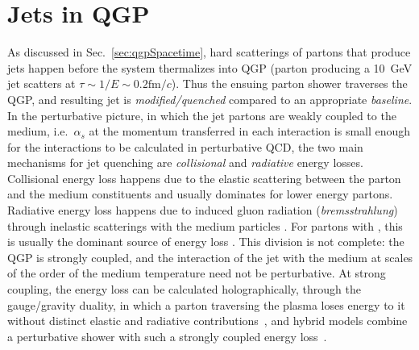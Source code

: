 \section{Jets in QGP}
\label{sec:jetsInQGP}
As discussed in Sec.~\ref{sec:qgpSpacetime}, hard scatterings of partons that produce jets happen before the system thermalizes into QGP (parton producing a 10~GeV jet scatters at \(\tau \sim 1/E \sim 0.2\text{fm}/c\)). 
%
Thus the ensuing parton shower traverses the QGP, and resulting jet is \emph{modified/quenched} compared to an appropriate \emph{baseline}. 
%
In the perturbative picture, in which the jet partons are weakly coupled to the medium, i.e.\ \(\alpha_s\) at the momentum transferred in each interaction is small enough for the interactions to be calculated in perturbative QCD, the two main mechanisms for jet quenching are \emph{collisional} and \emph{radiative} energy losses.
%
Collisional energy loss happens due to the elastic scattering between the parton and the medium constituents and usually dominates for lower energy partons. 
%
Radiative energy loss happens due to induced gluon radiation (\textit{bremsstrahlung}) through inelastic scatterings with the medium particles \cite{MAJUMDER201141,QinWang2024,Burkeetal}. 
%
For partons with  , this is usually the dominant source of energy loss \cite{LandoltBornstein2010:sm_lbs_978-3-642-01539-7_16}.
%
This division is not complete: the QGP is strongly coupled, and the interaction of the jet with the medium at scales of the order of the medium temperature need not be perturbative.
%
At strong coupling, the energy loss can be calculated holographically, through the gauge/gravity duality, in which a parton traversing the plasma loses energy to it without distinct elastic and radiative contributions~\cite{Chesler:2014jva}, and hybrid models combine a perturbative shower with such a strongly coupled energy loss~\cite{Casalderrey-Solana:2014bpa}.
%
%

